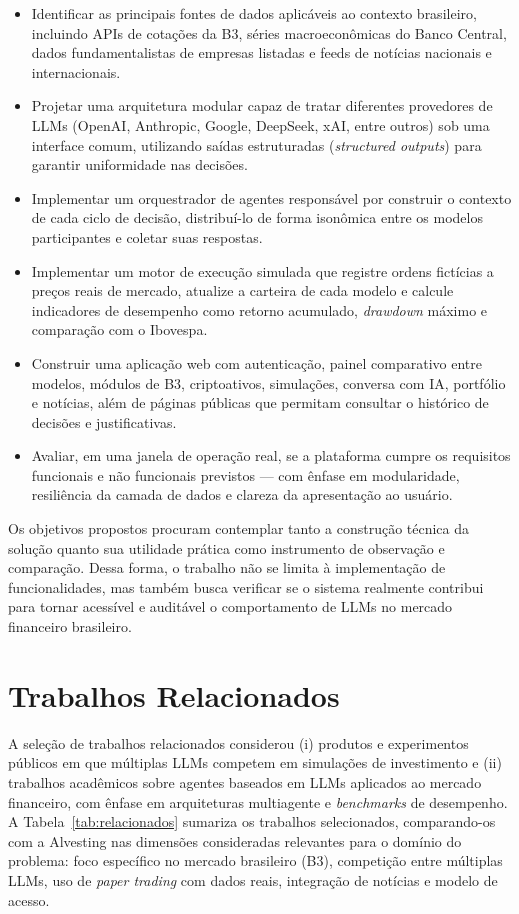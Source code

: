 \documentclass[portuguese]{sbcreviews-2025}
\begin{document}
\begin{itemize}
\item Identificar as principais fontes de dados aplicáveis ao contexto brasileiro, incluindo APIs de cotações da B3, séries macroeconômicas do Banco Central, dados fundamentalistas de empresas listadas e feeds de notícias nacionais e internacionais.
\item Projetar uma arquitetura modular capaz de tratar diferentes provedores de LLMs (OpenAI, Anthropic, Google, DeepSeek, xAI, entre outros) sob uma interface comum, utilizando saídas estruturadas (\textit{structured outputs}) para garantir uniformidade nas decisões.
\item Implementar um orquestrador de agentes responsável por construir o contexto de cada ciclo de decisão, distribuí-lo de forma isonômica entre os modelos participantes e coletar suas respostas.
\item Implementar um motor de execução simulada que registre ordens fictícias a preços reais de mercado, atualize a carteira de cada modelo e calcule indicadores de desempenho como retorno acumulado, \textit{drawdown} máximo e comparação com o Ibovespa.
\item Construir uma aplicação web com autenticação, painel comparativo entre modelos, módulos de B3, criptoativos, simulações, conversa com IA, portfólio e notícias, além de páginas públicas que permitam consultar o histórico de decisões e justificativas.
\item Avaliar, em uma janela de operação real, se a plataforma cumpre os requisitos funcionais e não funcionais previstos --- com ênfase em modularidade, resiliência da camada de dados e clareza da apresentação ao usuário.
\end{itemize}

Os objetivos propostos procuram contemplar tanto a construção técnica da solução quanto sua utilidade prática como instrumento de observação e comparação. Dessa forma, o trabalho não se limita à implementação de funcionalidades, mas também busca verificar se o sistema realmente contribui para tornar acessível e auditável o comportamento de LLMs no mercado financeiro brasileiro.

\section{Trabalhos Relacionados}

A seleção de trabalhos relacionados considerou (i) produtos e experimentos públicos em que múltiplas LLMs competem em simulações de investimento e (ii) trabalhos acadêmicos sobre agentes baseados em LLMs aplicados ao mercado financeiro, com ênfase em arquiteturas multiagente e \textit{benchmarks} de desempenho. A Tabela~\ref{tab:relacionados} sumariza os trabalhos selecionados, comparando-os com a Alvesting nas dimensões consideradas relevantes para o domínio do problema: foco específico no mercado brasileiro (B3), competição entre múltiplas LLMs, uso de \textit{paper trading} com dados reais, integração de notícias e modelo de acesso.
\end{document}
